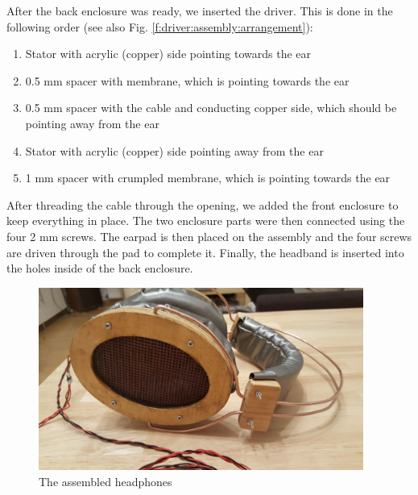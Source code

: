 \documentclass{article}
\begin{document}
After the back enclosure was ready, we inserted the driver. This is done in the following order (see also Fig. \ref{f:driver:assembly:arrangement}):

\begin{enumerate}
\item Stator with acrylic (copper) side pointing towards the ear
\item 0.5 mm spacer with membrane, which is pointing towards the ear
\item 0.5 mm spacer with the cable and conducting copper side, which should be pointing away from the ear
\item Stator with acrylic (copper) side pointing away from the ear
\item 1 mm spacer with crumpled membrane, which is pointing towards the ear
\end{enumerate}

After threading the cable through the opening, we added the front enclosure to keep everything in place. The two enclosure parts were then connected using the four 2 mm screws. The earpad is then placed on the assembly and the four screws are driven through the pad to complete it. Finally, the headband is inserted into the holes inside of the back enclosure.

\begin{figure}[htb]
    \centering
    \includegraphics[width=0.95\textwidth]{images/headphones_side.jpg}
    \caption{The assembled headphones}
    \label{f:assembly:phones}
\end{figure}
\end{document}

